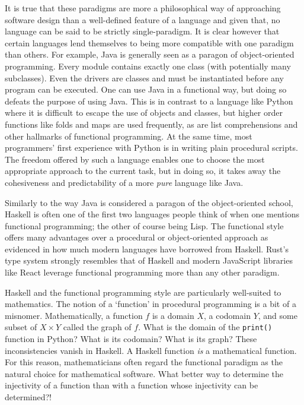 \documentclass[MS, xcolor=dvipsnames]{wfuthesis}
\theoremstyle{definition}
\begin{document}
It is true that these paradigms are more a philosophical way of approaching software design than a well-defined feature of a language and given that, no language can be said to be strictly single-paradigm. It is clear however that certain languages lend themselves to being more compatible with one paradigm than others. For example, Java is generally seen as a paragon of object-oriented programming. Every module contains exactly one class (with potentially many subclasses). Even the drivers are classes and must be instantiated before any program can be executed. One can use Java in a functional way, but doing so defeats the purpose of using Java. This is in contrast to a language like Python where it is difficult to escape the use of objects and classes, but higher order functions like folds and maps are used frequently, as are list comprehensions and other hallmarks of functional programming. At the same time, most programmers' first experience with Python is in writing plain procedural scripts. The freedom offered by such a language enables one to choose the most appropriate approach to the current task, but in doing so, it takes away the cohesiveness and predictability of a more \textit{pure} language like Java. \par
Similarly to the way Java is considered a paragon of the object-oriented school, Haskell is often one of the first two languages people think of when one mentions functional programming; the other of course being Lisp. The functional style offers many advantages over a procedural or object-oriented approach as evidenced in how much modern languages have borrowed from Haskell. Rust's type system strongly resembles that of Haskell \cite{Poss2014} and modern JavaScript libraries like React  leverage functional programming more than any other paradigm. \par
Haskell and the functional programming style are particularly well-suited to mathematics. The notion of a `function' in procedural programming is a bit of a misnomer. Mathematically, a function $f$ is a domain $X$, a codomain $Y$, and some subset of $X \times Y$ called the graph of $f$. What is the domain of the \lstinline{print()} function in Python? What is its codomain? What is its graph? These inconsistencies vanish in Haskell. A Haskell function \textit{is} a mathematical function. For this reason, mathematicians often regard the functional paradigm as the natural choice for mathematical software. What better way to determine the injectivity of a function than with a function whose injectivity can be determined?! \par
\end{document}
